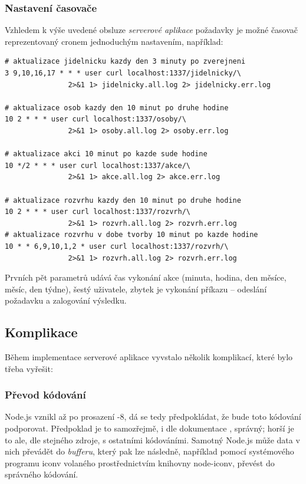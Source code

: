 \subsubsection{Nastavení časovače}
Vzhledem k výše uvedené obsluze \textit{serverové aplikace}  požadavky je možné časovač reprezentovaný cronem jednoduchým nastavením, například:
\begin{verbatim}
# aktualizace jidelnicku kazdy den 3 minuty po zverejneni
3 9,10,16,17 * * * user curl localhost:1337/jidelnicky/\
               2>&1 1> jidelnicky.all.log 2> jidelnicky.err.log

# aktualizace osob kazdy den 10 minut po druhe hodine
10 2 * * * user curl localhost:1337/osoby/\
               2>&1 1> osoby.all.log 2> osoby.err.log

# aktualizace akci 10 minut po kazde sude hodine
10 */2 * * * user curl localhost:1337/akce/\
               2>&1 1> akce.all.log 2> akce.err.log

# aktualizace rozvrhu kazdy den 10 minut po druhe hodine
10 2 * * * user curl localhost:1337/rozvrh/\
               2>&1 1> rozvrh.all.log 2> rozvrh.err.log
# aktualizace rozvrhu v dobe tvorby 10 minut po kazde hodine
10 * * 6,9,10,1,2 * user curl localhost:1337/rozvrh/\
               2>&1 1> rozvrh.all.log 2> rozvrh.err.log
\end{verbatim}
Prvních pět parametrů udává čas vykonání akce (minuta, hodina, den měsíce, měsíc, den týdne), šestý uživatele, zbytek je vykonání příkazu -- odeslání požadavku a zalogování výsledku.


\subsection{Komplikace}
Během implementace serverové aplikace vyvstalo několik komplikací, které bylo třeba vyřešit:

\subsubsection{Převod kódování}
Node.js vznikl až po prosazení -8, dá se tedy předpokládat, že bude toto kódování podporovat. Předpoklad je to samozřejmě, i dle dokumentace \cite{NodeEncoding}, správný; horší je to ale, dle stejného zdroje, s ostatními kódováními. Samotný Node.js může data v nich převádět do \textit{bufferu}, který pak lze následně, například pomocí systémového programu iconv volaného prostřednictvím knihovny node-iconv, převést do správného kódování.


